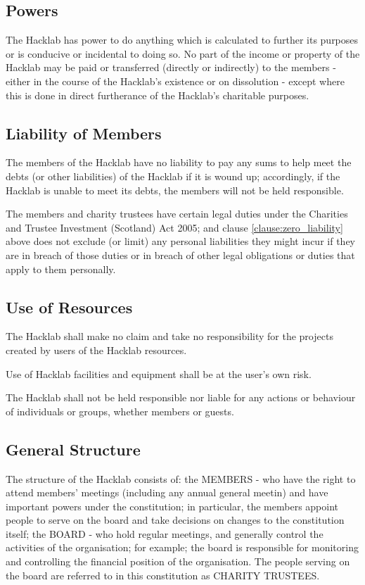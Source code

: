 \documentclass{article}
\newcommand{\charityact}{Charities and Trustee Investment (Scotland) Act 2005}
\begin{document}
\subsection{Powers}
\clause The Hacklab has power to do anything which is calculated to
further its purposes or is conducive or incidental to doing so.
\clause No part of the income or property of the Hacklab may be paid
or transferred (directly or indirectly) to the members - either in the
course of the Hacklab's existence or on dissolution - except where
this is done in direct furtherance of the Hacklab's charitable
purposes.
\subsection{Liability of Members}
\clause\label{clause:zero_liability} The members of the Hacklab have
no liability to pay any sums to help meet the debts (or other
liabilities) of the Hacklab if it is wound up; accordingly, if the
Hacklab is unable to meet its debts, the members will not be held
responsible.

\clause The members and charity trustees have certain legal duties
under the \charityact; and
clause \ref{clause:zero_liability} above does not exclude (or limit)
any personal liabilities they might incur if they are in breach of
those duties or in breach of other legal obligations or duties that
apply to them personally.
\subsection{Use of Resources}

\clause The Hacklab shall make no claim and take no responsibility for
the projects created by users of the Hacklab resources.  

\clause Use of Hacklab facilities and equipment shall be at the user's
own risk.

\clause The Hacklab shall not be held responsible nor liable for
any actions or behaviour of individuals or groups, whether
members or guests.

\subsection{General Structure}
\clause The structure of the Hacklab consists of:
  \subclause the MEMBERS - who have the right to attend members'
  meetings (including any annual general meetin) and have important
  powers under the constitution; in particular, the members appoint
  people to serve on the board and take decisions on changes to the
  constitution itself;
  \subclause the BOARD - who hold regular meetings, and generally
  control the activities of the organisation; for example; the board
  is responsible for monitoring and controlling the financial position
  of the organisation.
\clause The people serving on the board are referred to in this
constitution as CHARITY TRUSTEES.
\end{document}
